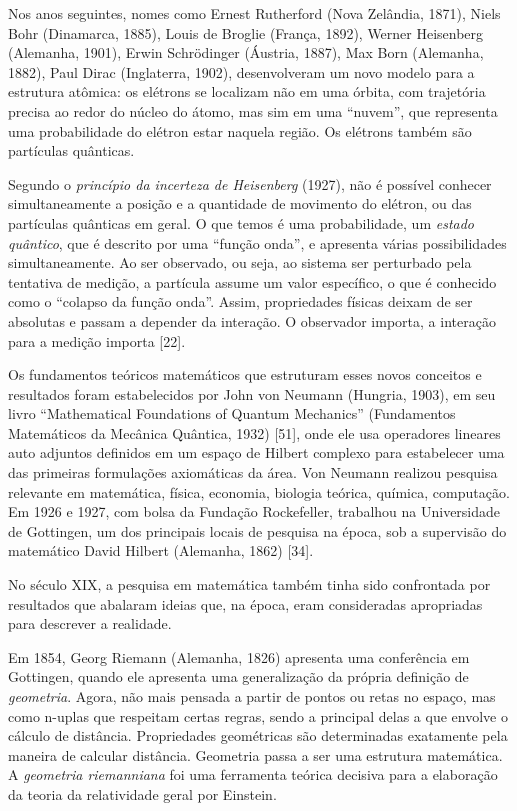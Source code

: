 \documentclass{hipatia}
\begin{document}
Nos anos seguintes, nomes como Ernest Rutherford (Nova Zelândia, 1871), Niels Bohr (Dinamarca, 1885), Louis de Broglie (França, 1892), Werner Heisenberg (Alemanha, 1901), Erwin Schrödinger (Áustria, 1887), Max Born (Alemanha, 1882), Paul Dirac (Inglaterra, 1902), desenvolveram um novo modelo para a estrutura atômica: os elétrons se localizam não em uma órbita, com trajetória precisa ao redor do núcleo do átomo, mas sim em uma ``nuvem'', que representa uma probabilidade do elétron estar naquela região. Os elétrons também são partículas quânticas.

Segundo o \textit{princípio da incerteza de Heisenberg} (1927), não é possível conhecer simultaneamente a posição e a quantidade de movimento do elétron, ou das partículas quânticas em geral. O que temos é uma probabilidade, um \textit{estado quântico}, que é descrito por uma ``função onda'', e apresenta várias possibilidades simultaneamente. Ao ser observado, ou seja, ao sistema ser perturbado pela tentativa de medição, a partícula assume um valor específico, o que é conhecido como o ``colapso da função onda''. Assim, propriedades físicas deixam de ser absolutas e passam a depender da interação. O observador importa, a interação para a medição importa [22].

Os fundamentos teóricos matemáticos que estruturam esses novos conceitos e resultados foram estabelecidos por John von Neumann (Hungria, 1903), em seu livro ``Mathematical Foundations of Quantum Mechanics'' (Fundamentos Matemáticos da Mecânica Quântica, 1932) [51], onde ele usa operadores lineares auto adjuntos definidos em um espaço de Hilbert complexo para estabelecer uma das primeiras formulações axiomáticas da área. Von Neumann realizou pesquisa relevante em matemática, física, economia, biologia teórica, química, computação. Em 1926 e 1927, com bolsa da Fundação Rockefeller, trabalhou na Universidade de Gottingen, um dos principais locais de pesquisa na época, sob a supervisão do matemático David Hilbert (Alemanha, 1862) [34].

No século XIX, a pesquisa em matemática também tinha sido confrontada por resultados que abalaram ideias que, na época, eram consideradas apropriadas para descrever a realidade.

Em 1854, Georg Riemann (Alemanha, 1826) apresenta uma conferência em Gottingen,  quando ele apresenta uma generalização da própria definição de \textit{geometria}. Agora, não mais pensada a partir de pontos ou retas no espaço, mas como n-uplas que respeitam certas regras, sendo a principal delas a que envolve o cálculo de distância. Propriedades geométricas são determinadas exatamente pela maneira de calcular distância. Geometria passa a ser uma estrutura matemática. A \textit{geometria riemanniana} foi uma ferramenta teórica decisiva para a elaboração da teoria da relatividade geral por Einstein.
\end{document}
